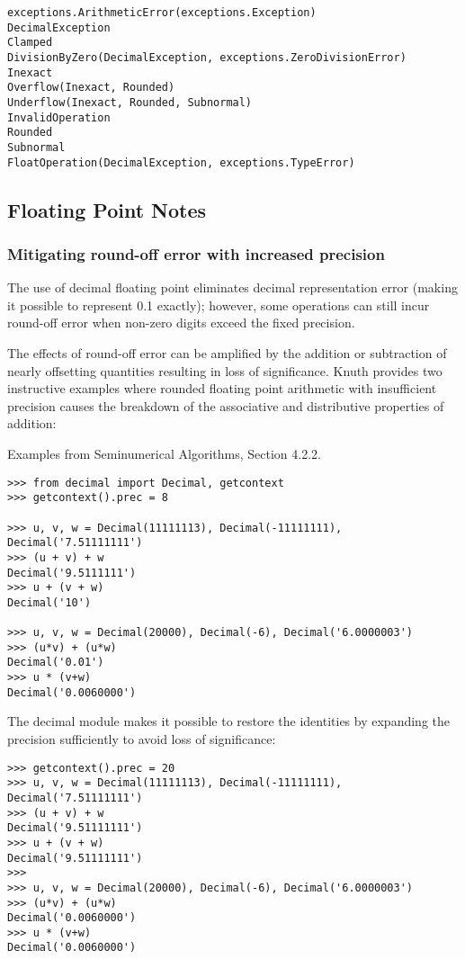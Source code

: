 \begin{lstlisting}
exceptions.ArithmeticError(exceptions.Exception)
DecimalException
Clamped
DivisionByZero(DecimalException, exceptions.ZeroDivisionError)
Inexact
Overflow(Inexact, Rounded)
Underflow(Inexact, Rounded, Subnormal)
InvalidOperation
Rounded
Subnormal
FloatOperation(DecimalException, exceptions.TypeError)
\end{lstlisting}


\subsection{Floating Point Notes}

\subsubsection{Mitigating round-off error with increased precision}

The use of decimal floating point eliminates decimal representation error (making it possible to represent 0.1 exactly); however, some operations can still incur round-off error when non-zero digits exceed the fixed precision.

\vpara
The effects of round-off error can be amplified by the addition or subtraction of nearly offsetting quantities resulting in loss of significance. Knuth provides two instructive examples where rounded floating point arithmetic with insufficient precision causes the breakdown of the associative and distributive properties of addition:

\vpara
Examples from Seminumerical Algorithms, Section 4.2.2.

\begin{lstlisting}
>>> from decimal import Decimal, getcontext
>>> getcontext().prec = 8

>>> u, v, w = Decimal(11111113), Decimal(-11111111), Decimal('7.51111111')
>>> (u + v) + w
Decimal('9.5111111')
>>> u + (v + w)
Decimal('10')

>>> u, v, w = Decimal(20000), Decimal(-6), Decimal('6.0000003')
>>> (u*v) + (u*w)
Decimal('0.01')
>>> u * (v+w)
Decimal('0.0060000')
\end{lstlisting}

The decimal module makes it possible to restore the identities by expanding the precision sufficiently to avoid loss of significance:

\begin{lstlisting}
>>> getcontext().prec = 20
>>> u, v, w = Decimal(11111113), Decimal(-11111111), Decimal('7.51111111')
>>> (u + v) + w
Decimal('9.51111111')
>>> u + (v + w)
Decimal('9.51111111')
>>>
>>> u, v, w = Decimal(20000), Decimal(-6), Decimal('6.0000003')
>>> (u*v) + (u*w)
Decimal('0.0060000')
>>> u * (v+w)
Decimal('0.0060000')
\end{lstlisting}

